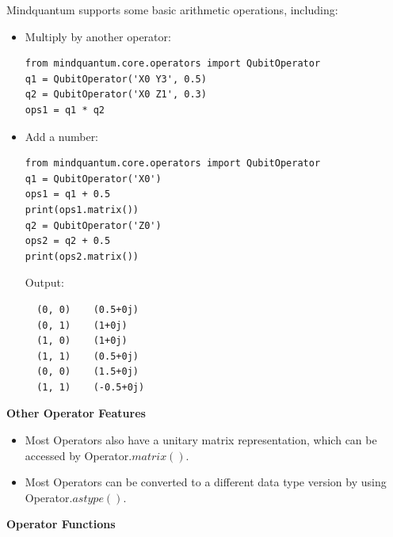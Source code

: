 Mindquantum supports some basic arithmetic operations, including:
\begin{itemize}
    \item Multiply by another operator:
          \begin{lstlisting}
from mindquantum.core.operators import QubitOperator
q1 = QubitOperator('X0 Y3', 0.5)
q2 = QubitOperator('X0 Z1', 0.3)
ops1 = q1 * q2
    \end{lstlisting}
    \item Add a number:
          \begin{lstlisting}
from mindquantum.core.operators import QubitOperator
q1 = QubitOperator('X0')
ops1 = q1 + 0.5
print(ops1.matrix())
q2 = QubitOperator('Z0')
ops2 = q2 + 0.5
print(ops2.matrix())
    \end{lstlisting}
          Output:
          \begin{lstlisting}
  (0, 0)	(0.5+0j)
  (0, 1)	(1+0j)
  (1, 0)	(1+0j)
  (1, 1)	(0.5+0j)
  (0, 0)	(1.5+0j)
  (1, 1)	(-0.5+0j)
\end{lstlisting}
\end{itemize}

\textbf{Other Operator Features}

\begin{itemize}
    \item Most Operators also have a unitary matrix representation, which can be accessed by Operator.$matrix()$.
    \item Most Operators can be converted to a different data type version by using Operator.$astype()$.
\end{itemize}

\textbf{Operator Functions}

